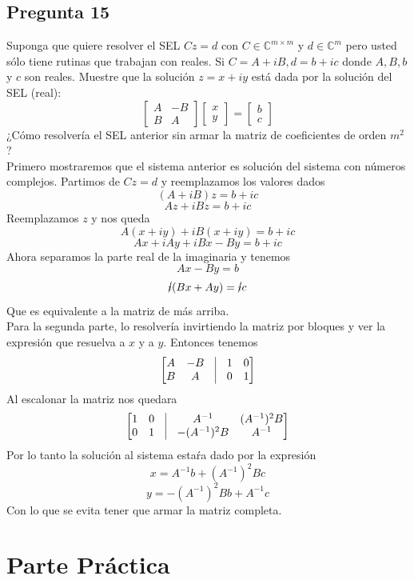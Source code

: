 \documentclass{article}
\begin{document}
\subsection*{Pregunta 15}
Suponga que quiere resolver el SEL $Cz = d$ con $C\in \mathbb{C}^{m\times m}$ y $d\in \mathbb{C}^{m}$ pero usted sólo tiene rutinas que trabajan con reales. Si $C = A + iB, d = b + ic$ donde $A,B,b$ y $c$ son reales. Muestre que la solución $z = x+iy$ está dada por la solución del SEL (real):
$$
\begin{bmatrix}
A&-B\\
B&A
\end{bmatrix}
\begin{bmatrix}
x\\
y
\end{bmatrix}
=
\begin{bmatrix}
b\\
c
\end{bmatrix}
$$
¿Cómo resolvería el SEL anterior sin armar la matriz de coeficientes de orden $m^{2}$?\\

Primero mostraremos que el sistema anterior es solución del sistema con números complejos. Partimos de $Cz=d$ y reemplazamos los valores dados
$$(A+iB)z = b + ic$$
$$Az + iBz = b + ic$$
Reemplazamos $z$ y nos queda
$$A(x+iy)+iB(x+iy) = b +ic$$
$$Ax + iAy + iBx -By = b +ic$$
Ahora separamos la parte real de la imaginaria y tenemos
$$Ax-By = b$$
$$\cancel{i}(Bx +Ay) = \cancel{i}c$$
Que es equivalente a la matriz de más arriba.\\

Para la segunda parte, lo resolvería invirtiendo la matriz por bloques y ver la expresión que resuelva a $x$ y a $y$. Entonces tenemos
$$\begin{bmatrix}
A & -B & \vrule & 1 & 0\\
B & A & \vrule & 0 & 1
\end{bmatrix}
$$
Al escalonar la matriz nos quedara
$$\begin{bmatrix}
1 & 0 & \vrule & A^{-1} & (A^{-1})^{2}B\\
0 & 1 & \vrule & -(A^{-1})^{2}B & A^{-1}
\end{bmatrix}
$$
Por lo tanto la solución al sistema estaŕa dado por la expresión
$$ x= A^{-1}b + (A^{-1})^{2}Bc$$
$$y = -(A^{-1})^{2}Bb + A^{-1}c$$
Con lo que se evita tener que armar la matriz completa.
\section*{Parte Práctica}
\end{document}
